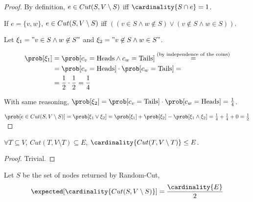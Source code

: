    \begin{proof}
        By definition, $e \in Cut(S, V \setminus S)$ iff $\cardinality{S \cap e} = 1$.

        If $e = \{ v,w \}$, $e \in Cut(S, V \setminus S)$ iff $( (v \in S \wedge w \not\in S) \vee (v \not\in S \wedge w \in S) )$.

        Let $\xi_1 = "v \in S \wedge w \not\in S"$ and $\xi_2 = "v \not\in S \wedge w \in S"$.


        \begin{equation*}
            \begin{split}
                \prob[\xi_1]    &= \prob[c_v = \text{Heads} \wedge c_w = \text{Tails}] \overset{\text{(by independence of the coins)}}{=}\\
                                &= \prob[c_v = \text{Heads}] \cdot \prob[c_w = \text{Tails}] =\\
                                &= \frac{1}{2} \cdot \frac{1}{2} = \frac{1}{4}
            \end{split}
        \end{equation*}

        With same reasoning, $\prob[\xi_2] = \prob[c_v = \text{Tails}] \cdot \prob[c_w = \text{Heads}] = \frac{1}{4}$.

        $\prob[e \in \cut] = \prob[\xi_1 \vee \xi_2] = \prob[\xi_1] + \prob[\xi_2] - \prob[\xi_1 \wedge \xi_2] = \frac{1}{4} + \frac{1}{4} + 0 = \frac{1}{2}$
    \end{proof}
    
    \begin{lemma}
        $\forall T \subseteq V$, $Cut(T, V \setminus T) \subseteq E$, $\cardinality{Cut(T, V \setminus T)} \leq E$.
    \end{lemma}

    \begin{proof}
        Trivial.
    \end{proof}

    \begin{corollary}\label{cor:randcut_3}
        Let $S$ be the set of nodes returned by Random-Cut, 
        \[ \expected[ \cardinality{\cut}] = \frac{\cardinality{E}}{2} \]
    \end{corollary}


